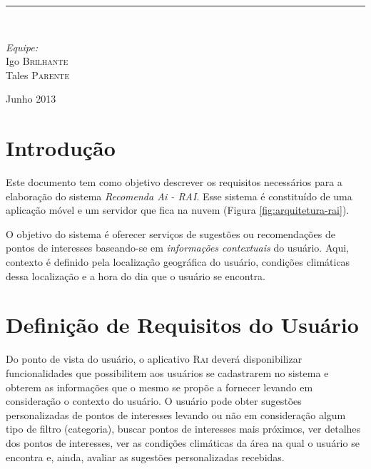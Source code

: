 \documentclass[11pt,a4paper,oneside]{article}
\newcommand{\HRule}{\rule{\linewidth}{0.5mm}}
\begin{document}
\begin{titlepage}
\begin{center}
\HRule \\[1.5cm]

\begin{minipage}{0.4\textwidth}
\begin{flushleft} \large
\emph{Equipe:}\\
Igo \textsc{Brilhante}\\
Tales \textsc{Parente}
\end{flushleft}
\end{minipage}

\vfill

{\large Junho 2013}

\end{center}
\end{titlepage}

\section{Introdução}

Este documento tem como objetivo descrever os requisitos necessários para a elaboração do sistema \emph{Recomenda Ai - RAI}. Esse sistema é constituído de uma aplicação móvel e um servidor que fica na nuvem (Figura \ref{fig:arquitetura-rai}).

O objetivo do sistema é oferecer serviços de sugestões ou recomendações de pontos de interesses baseando-se em \emph{informações contextuais} do usuário. Aqui, contexto é definido pela localização geográfica do usuário, condições climáticas dessa localização e a hora do dia que o usuário se encontra.

\section{Definição de Requisitos do Usuário}

Do ponto de vista do usuário, o aplicativo \textsc{Rai} deverá disponibilizar funcionalidades que possibilitem aos usuários se cadastrarem no sistema e obterem as informações que o mesmo se propõe a fornecer levando em consideração o contexto do usuário. O usuário pode obter sugestões personalizadas de pontos de interesses levando ou não em consideração algum tipo de filtro (categoria), buscar pontos de interesses mais próximos, ver detalhes dos pontos de interesses, ver as condições climáticas da área na qual o usuário se encontra e, ainda, avaliar as sugestões personalizadas recebidas.
\end{document}

